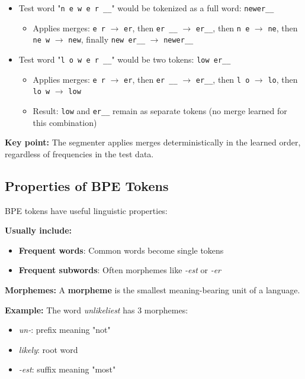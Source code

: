 \documentclass[11pt,a4paper]{article}
\theoremstyle{definition}
\theoremstyle{plain}
\theoremstyle{remark}
\begin{document}
\begin{itemize}
    \item Test word "\texttt{n e w e r \_\_}" would be tokenized as a full word: \texttt{newer\_\_}
    \begin{itemize}
        \item Applies merges: \texttt{e r} $\rightarrow$ \texttt{er}, then \texttt{er \_\_} $\rightarrow$ \texttt{er\_\_}, then \texttt{n e} $\rightarrow$ \texttt{ne}, then \texttt{ne w} $\rightarrow$ \texttt{new}, finally \texttt{new er\_\_} $\rightarrow$ \texttt{newer\_\_}
    \end{itemize}
    
    \item Test word "\texttt{l o w e r \_\_}" would be two tokens: \texttt{low er\_\_}
    \begin{itemize}
        \item Applies merges: \texttt{e r} $\rightarrow$ \texttt{er}, then \texttt{er \_\_} $\rightarrow$ \texttt{er\_\_}, then \texttt{l o} $\rightarrow$ \texttt{lo}, then \texttt{lo w} $\rightarrow$ \texttt{low}
        \item Result: \texttt{low} and \texttt{er\_\_} remain as separate tokens (no merge learned for this combination)
    \end{itemize}
\end{itemize}

\textbf{Key point:} The segmenter applies merges deterministically in the learned order, regardless of frequencies in the test data.

\subsection{Properties of BPE Tokens}

BPE tokens have useful linguistic properties:

\textbf{Usually include:}
\begin{itemize}
    \item \textbf{Frequent words}: Common words become single tokens
    \item \textbf{Frequent subwords}: Often morphemes like \textit{-est} or \textit{-er}
\end{itemize}

\textbf{Morphemes:} A \textbf{morpheme} is the smallest meaning-bearing unit of a language.

\textbf{Example:} The word \textit{unlikeliest} has 3 morphemes:
\begin{itemize}
    \item \textit{un-}: prefix meaning "not"
    \item \textit{likely}: root word
    \item \textit{-est}: suffix meaning "most"
\end{itemize}
\end{document}
